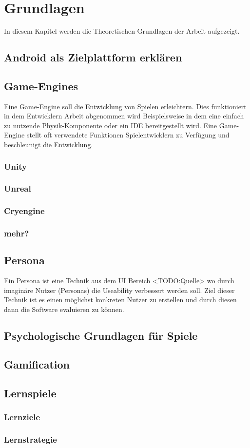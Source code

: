 \section{Grundlagen}
	In diesem Kapitel werden die Theoretischen Grundlagen der Arbeit aufgezeigt.
\subsection{Android als Zielplattform erklären}
\subsection{Game-Engines}
	Eine Game-Engine soll die Entwicklung von Spielen erleichtern. Dies funktioniert in dem Entwicklern Arbeit abgenommen wird Beispielsweise in dem eine einfach zu nutzende Physik-Komponente oder ein \gls{IDE} bereitgestellt wird. Eine Game-Engine stellt oft verwendete Funktionen Spielentwicklern zu Verfügung und beschleunigt die Entwicklung.
	\subsubsection*{Unity}
	\subsubsection*{Unreal}
	\subsubsection*{Cryengine}
	\subsubsection*{mehr?}
\subsection{Persona}\label{ssec:persona}
	Ein Persona ist eine Technik aus dem UI Bereich <TODO:Quelle> wo durch imaginäre Nutzer (Personas) die Useability verbessert werden soll. Ziel dieser Technik ist es einen möglichst konkreten Nutzer zu erstellen und durch diesen dann die Software evaluieren zu können.
\subsection{Psychologische Grundlagen für Spiele}
\subsection{Gamification}
\subsection{Lernspiele}
	\subsubsection{Lernziele}
	\subsubsection{Lernstrategie}
